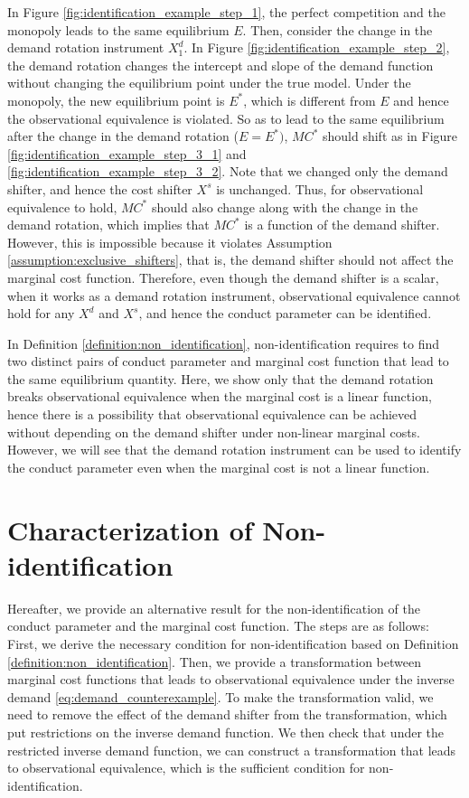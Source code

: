 \documentclass[11pt, a4paper]{article}
\theoremstyle{remark}
\begin{document}
In Figure \ref{fig:identification_example_step_1}, the perfect competition and the monopoly leads to the same equilibrium $E$.
Then, consider the change in the demand rotation instrument $X^{d}_1$.
In Figure \ref{fig:identification_example_step_2}, the demand rotation changes the intercept and slope of the demand function without changing the equilibrium point under the true model.
Under the monopoly, the new equilibrium point is $E^{*}$, which is different from $E$ and hence the observational equivalence is violated.
So as to lead to the same equilibrium after the change in the demand rotation ($E = E^{*})$, $MC^{*}$ should shift as in Figure \ref{fig:identification_example_step_3_1} and \ref{fig:identification_example_step_3_2}.
Note that we changed only the demand shifter, and hence the cost shifter $X^{s}$ is unchanged.
Thus, for observational equivalence to hold, $MC^{*}$ should also change along with the change in the demand rotation, which implies that $MC^{*}$ is a function of the demand shifter.
However, this is impossible because it violates Assumption \ref{assumption:exclusive_shifters}, that is, the demand shifter should not affect the marginal cost function.
Therefore, even though the demand shifter is a scalar, when it works as a demand rotation instrument, observational equivalence cannot hold for any $X^{d}$ and $X^{s}$, and hence the conduct parameter can be identified.


In Definition \ref{definition:non_identification}, non-identification requires to find two distinct pairs of conduct parameter and marginal cost function that lead to the same equilibrium quantity.
Here, we show only that the demand rotation breaks observational equivalence when the marginal cost is a linear function, hence there is a possibility that observational equivalence can be achieved without depending on the demand shifter under non-linear marginal costs.
However, we will see that the demand rotation instrument can be used to identify the conduct parameter even when the marginal cost is not a linear function.





\section{Characterization of Non-identification}\label{sec:nonidentification_characterization}

Hereafter, we provide an alternative result for the non-identification of the conduct parameter and the marginal cost function. 
The steps are as follows:
First, we derive the necessary condition for non-identification based on Definition \ref{definition:non_identification}.
Then, we provide a transformation between marginal cost functions that leads to observational equivalence under the inverse demand \eqref{eq:demand_counterexample}.
To make the transformation valid, we need to remove the effect of the demand shifter from the transformation, which put restrictions on the inverse demand function.
We then check that under the restricted inverse demand function, we can construct a transformation that leads to observational equivalence, which is the sufficient condition for non-identification.
\end{document}
